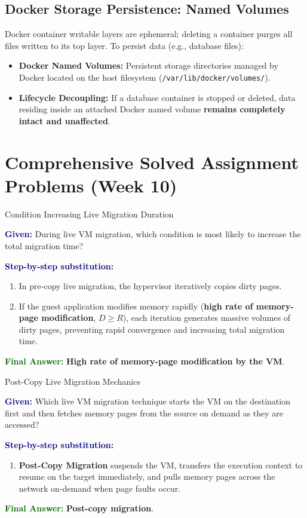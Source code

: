 \documentclass[11pt,a4paper,openany]{report}
\newcommand{\Given}{\par\textbf{\textcolor{navy}{Given:}} }
\newcommand{\Steps}{\par\textbf{\textcolor{navy}{Step-by-step substitution:}}\par}
\newcommand{\Answer}{\par\textbf{\textcolor{darkgreen}{Final Answer:}} }
\begin{document}
\subsection{Docker Storage Persistence: Named Volumes}
Docker container writable layers are ephemeral; deleting a container purges all files written to its top layer. To persist data (e.g., database files):
\begin{itemize}[leftmargin=*]
  \item \textbf{Docker Named Volumes:} Persistent storage directories managed by Docker located on the host filesystem (\texttt{/var/lib/docker/volumes/}).
  \item \textbf{Lifecycle Decoupling:} If a database container is stopped or deleted, data residing inside an attached Docker named volume \textbf{remains completely intact and unaffected}.
\end{itemize}

\section{Comprehensive Solved Assignment Problems (Week 10)}

\begin{solved}{Condition Increasing Live Migration Duration}
\Given During live VM migration, which condition is most likely to increase the total migration time?
\Steps
\begin{enumerate}[leftmargin=*]
  \item In pre-copy live migration, the hypervisor iteratively copies dirty pages.
  \item If the guest application modifies memory rapidly (\textbf{high rate of memory-page modification}, $D \ge R$), each iteration generates massive volumes of dirty pages, preventing rapid convergence and increasing total migration time.
\end{enumerate}
\Answer \textbf{High rate of memory-page modification by the VM}.
\end{solved}

\begin{solved}{Post-Copy Live Migration Mechanics}
\Given Which live VM migration technique starts the VM on the destination first and then fetches memory pages from the source on demand as they are accessed?
\Steps
\begin{enumerate}[leftmargin=*]
  \item \textbf{Post-Copy Migration} suspends the VM, transfers the execution context to resume on the target immediately, and pulls memory pages across the network on-demand when page faults occur.
\end{enumerate}
\Answer \textbf{Post-copy migration}.
\end{solved}
\end{document}
